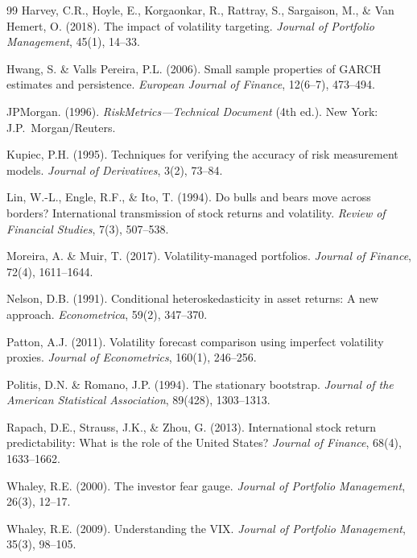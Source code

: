 \documentclass[12pt,a4paper]{article}
\begin{document}
\begin{thebibliography}{99}
Harvey, C.R., Hoyle, E., Korgaonkar, R., Rattray, S., Sargaison, M., \& Van Hemert, O. (2018). The impact of volatility targeting. \textit{Journal of Portfolio Management}, 45(1), 14--33.

Hwang, S. \& Valls Pereira, P.L. (2006). Small sample properties of GARCH estimates and persistence. \textit{European Journal of Finance}, 12(6--7), 473--494.

JPMorgan. (1996). \textit{RiskMetrics---Technical Document} (4th ed.). New York: J.P.~Morgan/Reuters.

Kupiec, P.H. (1995). Techniques for verifying the accuracy of risk measurement models. \textit{Journal of Derivatives}, 3(2), 73--84.

Lin, W.-L., Engle, R.F., \& Ito, T. (1994). Do bulls and bears move across borders? International transmission of stock returns and volatility. \textit{Review of Financial Studies}, 7(3), 507--538.

Moreira, A. \& Muir, T. (2017). Volatility-managed portfolios. \textit{Journal of Finance}, 72(4), 1611--1644.

Nelson, D.B. (1991). Conditional heteroskedasticity in asset returns: A new approach. \textit{Econometrica}, 59(2), 347--370.

Patton, A.J. (2011). Volatility forecast comparison using imperfect volatility proxies. \textit{Journal of Econometrics}, 160(1), 246--256.

Politis, D.N. \& Romano, J.P. (1994). The stationary bootstrap. \textit{Journal of the American Statistical Association}, 89(428), 1303--1313.

Rapach, D.E., Strauss, J.K., \& Zhou, G. (2013). International stock return predictability: What is the role of the United States? \textit{Journal of Finance}, 68(4), 1633--1662.

Whaley, R.E. (2000). The investor fear gauge. \textit{Journal of Portfolio Management}, 26(3), 12--17.

Whaley, R.E. (2009). Understanding the VIX. \textit{Journal of Portfolio Management}, 35(3), 98--105.

\end{thebibliography}
\end{document}
